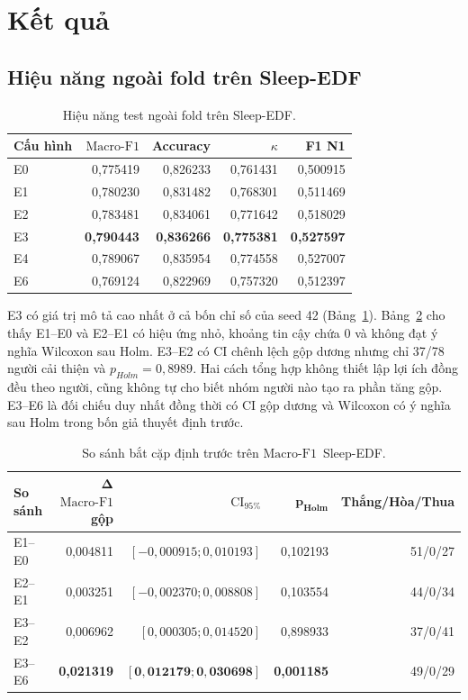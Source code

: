 \documentclass[10pt,a4paper]{article}
\newcommand{\mf}{\ensuremath{\mathrm{Macro\mbox{-}F1}}}
\newcommand{\ci}{\ensuremath{\mathrm{CI}_{95\%}}}
\begin{document}
\section{Kết quả}

\subsection{Hiệu năng ngoài fold trên Sleep-EDF}

\begin{table}[t]
\centering
\caption{Hiệu năng test ngoài fold trên Sleep-EDF.}
\label{tab:sleepedf-performance}
\small
\begin{tabular}{lrrrr}
\toprule
\textbf{Cấu hình} & \textbf{\mf} & \textbf{Accuracy} & \textbf{$\kappa$} & \textbf{F1 N1} \\
\midrule
E0 & 0,775419 & 0,826233 & 0,761431 & 0,500915 \\
E1 & 0,780230 & 0,831482 & 0,768301 & 0,511469 \\
E2 & 0,783481 & 0,834061 & 0,771642 & 0,518029 \\
E3 & \textbf{0,790443} & \textbf{0,836266} & \textbf{0,775381} & \textbf{0,527597} \\
E4 & 0,789067 & 0,835954 & 0,774558 & 0,527007 \\
E6 & 0,769124 & 0,822969 & 0,757320 & 0,512397 \\
\bottomrule
\end{tabular}
\end{table}

E3 có giá trị mô tả cao nhất ở cả bốn chỉ số của seed 42 (Bảng~\ref{tab:sleepedf-performance}). Bảng~\ref{tab:paired-sleepedf} cho thấy E1--E0 và E2--E1 có hiệu ứng nhỏ, khoảng tin cậy chứa 0 và không đạt ý nghĩa Wilcoxon sau Holm. E3--E2 có CI chênh lệch gộp dương nhưng chỉ 37/78 người cải thiện và $p_{Holm}=0,8989$. Hai cách tổng hợp không thiết lập lợi ích đồng đều theo người, cũng không tự cho biết nhóm người nào tạo ra phần tăng gộp. E3--E6 là đối chiếu duy nhất đồng thời có CI gộp dương và Wilcoxon có ý nghĩa sau Holm trong bốn giả thuyết định trước.

\begin{table}[t]
\centering
\caption{So sánh bắt cặp định trước trên \mf\ Sleep-EDF.}
\label{tab:paired-sleepedf}
\small
\begin{tabular}{lrrrr}
\toprule
\textbf{So sánh} & $\boldsymbol{\Delta}$\textbf{\mf\ gộp} & \textbf{\ci} & $\boldsymbol{p_{Holm}}$ & \textbf{Thắng/Hòa/Thua} \\
\midrule
E1--E0 & 0,004811 & $[-0,000915;0,010193]$ & 0,102193 & 51/0/27 \\
E2--E1 & 0,003251 & $[-0,002370;0,008808]$ & 0,103554 & 44/0/34 \\
E3--E2 & 0,006962 & $[0,000305;0,014520]$ & 0,898933 & 37/0/41 \\
E3--E6 & \textbf{0,021319} & $\boldsymbol{[0,012179;0,030698]}$ & \textbf{0,001185} & 49/0/29 \\
\bottomrule
\end{tabular}
\end{table}
\end{document}
